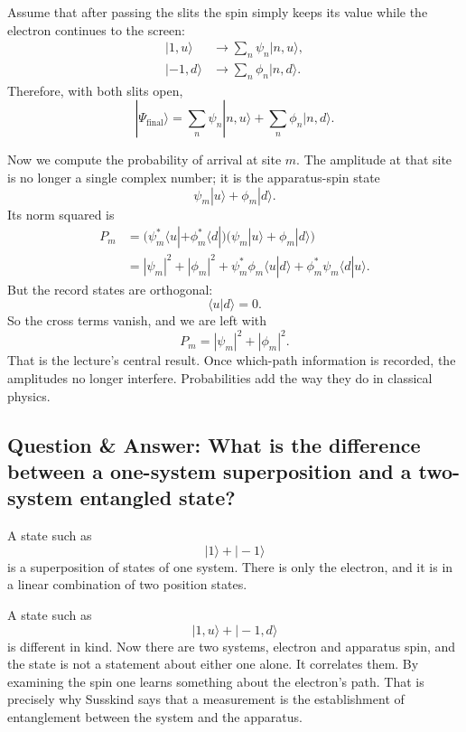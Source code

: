 Assume that after passing the slits the spin simply keeps its value while the electron continues to the screen:
\begin{align}
|1,u\rangle &\longrightarrow \sum_n \psi_n |n,u\rangle, \\
|-1,d\rangle &\longrightarrow \sum_n \phi_n |n,d\rangle.
\end{align}
Therefore, with both slits open,
\begin{equation}
|\Psi_{\mathrm{final}}\rangle
  = \sum_n \psi_n |n,u\rangle + \sum_n \phi_n |n,d\rangle.
\end{equation}

Now we compute the probability of arrival at site \(m\). The amplitude at that site is no longer a single complex number; it is the apparatus-spin state
\begin{equation}
\psi_m |u\rangle + \phi_m |d\rangle.
\end{equation}
Its norm squared is
\begin{align}
P_m
  &= \bigl(\psi_m^*\langle u|+\phi_m^*\langle d|\bigr)
     \bigl(\psi_m|u\rangle+\phi_m|d\rangle\bigr) \\
  &= |\psi_m|^2 + |\phi_m|^2
     + \psi_m^*\phi_m \langle u|d\rangle
     + \phi_m^*\psi_m \langle d|u\rangle.
\end{align}
But the record states are orthogonal:
\begin{equation}
\langle u|d\rangle=0.
\end{equation}
So the cross terms vanish, and we are left with
\begin{equation}
P_m = |\psi_m|^2 + |\phi_m|^2.
\end{equation}
That is the lecture's central result. Once which-path information is recorded, the amplitudes no longer interfere. Probabilities add the way they do in classical physics.

\subsection{Question \& Answer: What is the difference between a one-system superposition and a two-system entangled state?}

A state such as
\begin{equation}
|1\rangle+|-1\rangle
\end{equation}
is a superposition of states of one system. There is only the electron, and it is in a linear combination of two position states.

A state such as
\begin{equation}
|1,u\rangle+|-1,d\rangle
\end{equation}
is different in kind. Now there are two systems, electron and apparatus spin, and the state is not a statement about either one alone. It correlates them. By examining the spin one learns something about the electron's path. That is precisely why Susskind says that a measurement is the establishment of entanglement between the system and the apparatus.

